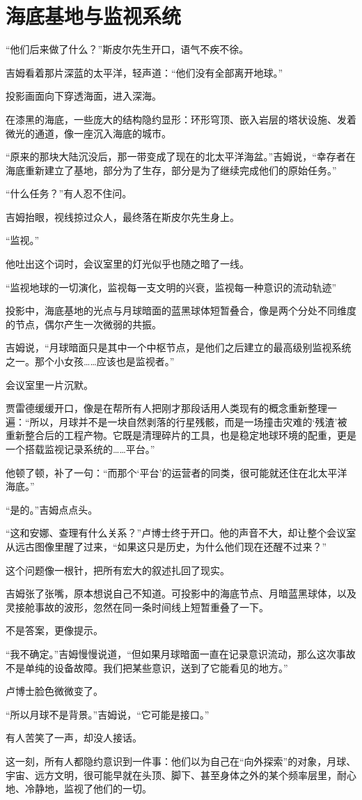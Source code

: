 \chapter{海底基地与监视系统}

“他们后来做了什么？”斯皮尔先生开口，语气不疾不徐。

吉姆看着那片深蓝的太平洋，轻声道：“他们没有全部离开地球。”

投影画面向下穿透海面，进入深海。

在漆黑的海底，一些庞大的结构隐约显形：环形穹顶、嵌入岩层的塔状设施、发着微光的通道，像一座沉入海底的城市。

“原来的那块大陆沉没后，那一带变成了现在的北太平洋海盆。”吉姆说，“幸存者在海底重新建立了基地，部分为了生存，部分是为了继续完成他们的原始任务。”

“什么任务？”有人忍不住问。

吉姆抬眼，视线掠过众人，最终落在斯皮尔先生身上。

“监视。”

他吐出这个词时，会议室里的灯光似乎也随之暗了一线。

“监视地球的一切演化，监视每一支文明的兴衰，监视每一种意识的流动轨迹”

投影中，海底基地的光点与月球暗面的蓝黑球体短暂叠合，像是两个分处不同维度的节点，偶尔产生一次微弱的共振。

吉姆说，“月球暗面只是其中一个中枢节点，是他们之后建立的最高级别监视系统之一。那个小女孩……应该也是监视者。”

会议室里一片沉默。

贾雷德缓缓开口，像是在帮所有人把刚才那段话用人类现有的概念重新整理一遍：“所以，月球并不是一块自然剥落的行星残骸，而是一场撞击灾难的‘残渣’被重新整合后的工程产物。它既是清理碎片的工具，也是稳定地球环境的配重，更是一个搭载监视记录系统的……平台。”

他顿了顿，补了一句：“而那个‘平台’的运营者的同类，很可能就还住在北太平洋海底。”

“是的。”吉姆点点头。

“这和安娜、查理有什么关系？”卢博士终于开口。他的声音不大，却让整个会议室从远古图像里醒了过来，“如果这只是历史，为什么他们现在还醒不过来？”

这个问题像一根针，把所有宏大的叙述扎回了现实。

吉姆张了张嘴，原本想说自己不知道。可投影中的海底节点、月暗蓝黑球体，以及灵接舱事故的波形，忽然在同一条时间线上短暂重叠了一下。

不是答案，更像提示。

“我不确定。”吉姆慢慢说道，“但如果月球暗面一直在记录意识流动，那么这次事故不是单纯的设备故障。我们把某些意识，送到了它能看见的地方。”

卢博士脸色微微变了。

“所以月球不是背景。”吉姆说，“它可能是接口。”

有人苦笑了一声，却没人接话。

这一刻，所有人都隐约意识到一件事：他们以为自己在“向外探索”的对象，月球、宇宙、远方文明，很可能早就在头顶、脚下、甚至身体之外的某个频率层里，耐心地、冷静地，监视了他们的一切。
